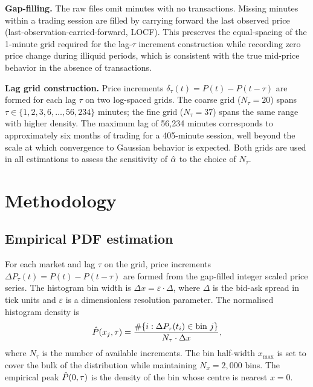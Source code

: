 \documentclass[12pt,a4paper]{article}
\begin{document}
\textbf{Gap-filling.} The raw files omit minutes with no transactions. Missing
minutes within a trading session are filled by carrying forward the last
observed price (last-observation-carried-forward, LOCF). This preserves the
equal-spacing of the 1-minute grid required for the lag-$\tau$ increment
construction while recording zero price change during illiquid periods, which
is consistent with the true mid-price behavior in the absence of transactions.

\textbf{Lag grid construction.} Price increments $\delta_\tau(t) = P(t) -
P(t-\tau)$ are formed for each lag $\tau$ on two log-spaced grids. The coarse
grid ($N_\tau = 20$) spans $\tau \in \{1, 2, 3, 6, \ldots, 56{,}234\}$
minutes; the fine grid ($N_\tau = 37$) spans the same range with higher
density. The maximum lag of 56,234 minutes corresponds to approximately six
months of trading for a 405-minute session, well beyond the scale at which
convergence to Gaussian behavior is expected. Both grids are used in all
estimations to assess the sensitivity of $\hat{\alpha}$ to the choice of $N_\tau$.


\section{Methodology}
\label{sec:methodology}

\subsection{Empirical PDF estimation}
\label{sec:methodology:pdf}

For each market and lag $\tau$ on the grid, price increments
$\Delta P_\tau(t) = P(t) - P(t-\tau)$ are formed from the gap-filled
integer scaled price series. The histogram bin width is $\Delta x = \varepsilon
\cdot \Delta$, where $\Delta$ is the bid-ask spread in tick units and
$\varepsilon$ is a dimensionless resolution parameter. The normalised histogram
density is
\begin{equation}
  \hat{P}(x_j,\tau)
  = \frac{\#\{i: \Delta P_\tau(t_i)\in\text{bin }j\}}{N_\tau\cdot\Delta x},
  \label{eq:pdf_hat}
\end{equation}
where $N_\tau$ is the number of available increments. The bin half-width
$x_{\max}$ is set to cover the bulk of the distribution while maintaining
$N_x = 2{,}000$ bins. The empirical peak $\hat{P}(0,\tau)$ is the density of the
bin whose centre is nearest $x = 0$.
\end{document}
